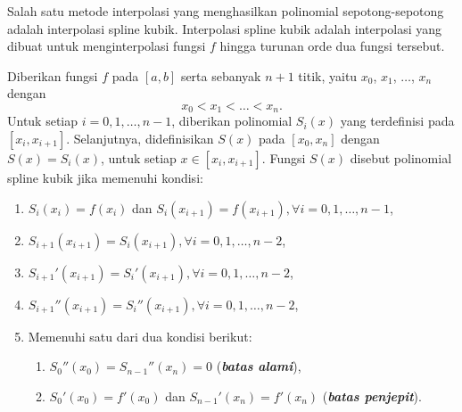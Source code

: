 Salah satu metode interpolasi yang menghasilkan polinomial sepotong-sepotong adalah interpolasi spline kubik. Interpolasi spline kubik adalah interpolasi yang dibuat untuk menginterpolasi fungsi $f$ hingga turunan orde dua fungsi tersebut. 

\begin{definisi}
	Diberikan fungsi \(f\) pada \([a,b]\) serta sebanyak \(n+1\) titik, yaitu $x_0$, $x_1$, $\dots$, $x_n$ dengan
	$$ x_0<x_1<\dots<x_n.$$
 Untuk setiap $i=0,1,\dots,n-1$, diberikan polinomial $S_i(x)$ yang terdefinisi pada $[x_{i},x_{i+1}]$. Selanjutnya, didefinisikan $S(x)$ pada $[x_0,x_n]$ dengan
 $S(x)=S_i(x)$, untuk setiap $x \in [x_i, x_{i+1}]$.
 Fungsi $ S(x) $ disebut polinomial spline kubik jika memenuhi kondisi:
	\begin{enumerate}
		\item $S_i(x_i)=f(x_i)$ dan $ S_i(x_{i+1})=f(x_{i+1}), \forall i=0,1,\dots,n-1 $,
		\item $ S_{i+1}(x_{i+1})=S_i(x_{i+1}), \forall i=0,1,\dots,n-2 $,
		\item $ S_{i+1}'(x_{i+1})=S_i'(x_{i+1}), \forall i=0,1,\dots,n-2 $,
		\item $ S_{i+1}''(x_{i+1})=S_i''(x_{i+1}), \forall i=0,1,\dots,n-2 $,
		\item Memenuhi satu dari dua kondisi berikut:
		\begin{enumerate}
			\item $ S_0''(x_0)=S_{n-1}''(x_n)=0 $ (\textbf{\textit{batas alami}}),
			\item $ S_0'(x_0) = f'(x_0) $ dan $ S_{n-1}'(x_n) = f'(x_n) $ (\textbf{\textit{batas penjepit}}).
		\end{enumerate}
	\end{enumerate}
\end{definisi}
